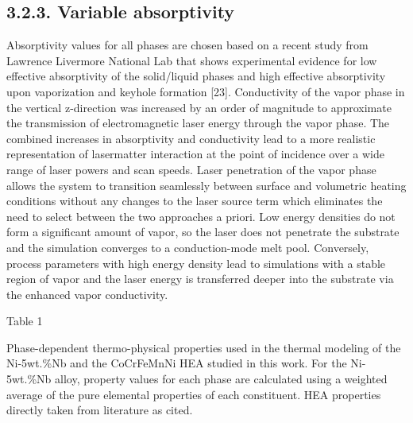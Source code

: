 \documentclass[10pt]{article}
\begin{document}
\subsection*{3.2.3. Variable absorptivity}
Absorptivity values for all phases are chosen based on a recent study from Lawrence Livermore National Lab that shows experimental evidence for low effective absorptivity of the solid/liquid phases and high effective absorptivity upon vaporization and keyhole formation [23]. Conductivity of the vapor phase in the vertical z-direction was increased by an order of magnitude to approximate the transmission of electromagnetic laser energy through the vapor phase. The combined increases in absorptivity and conductivity lead to a more realistic representation of lasermatter interaction at the point of incidence over a wide range of laser powers and scan speeds. Laser penetration of the vapor phase allows the system to transition seamlessly between surface and volumetric heating conditions without any changes to the laser source term which eliminates the need to select between the two approaches a priori. Low energy densities do not form a significant amount of vapor, so the laser does not penetrate the substrate and the simulation converges to a conduction-mode melt pool. Conversely, process parameters with high energy density lead to simulations with a stable region of vapor and the laser energy is transferred deeper into the substrate via the enhanced vapor conductivity.

Table 1

Phase-dependent thermo-physical properties used in the thermal modeling of the Ni-5wt.\%Nb and the CoCrFeMnNi HEA studied in this work. For the Ni-5wt.\%Nb alloy, property values for each phase are calculated using a weighted average of the pure elemental properties of each constituent. HEA properties directly taken from literature as cited.
\end{document}
